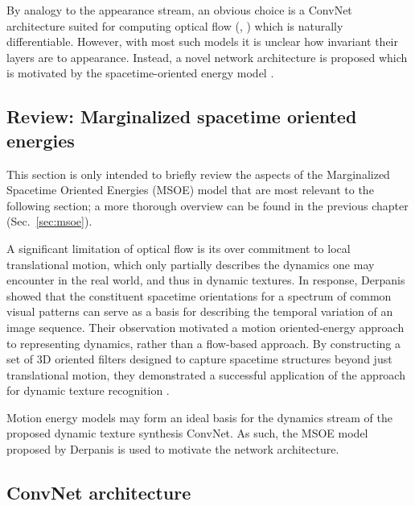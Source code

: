 By analogy to the appearance stream, an obvious choice
is a ConvNet architecture suited for computing
optical flow (\eg, \cite{dosovitskiy2015,ilg2017}) which
is naturally differentiable.
However, with most such models it is unclear how invariant
their layers are to appearance.
Instead, a novel network architecture is proposed which is
motivated by the spacetime-oriented energy model
\cite{derpanis2012spacetime,simoncelli1998}.

\subsection{Review: Marginalized spacetime oriented energies}

 This section is only intended to briefly review the aspects of the Marginalized Spacetime Oriented Energies (MSOE) model \cite{derpanis2012spacetime} that are most relevant to the following section; a more thorough overview can be found in the previous chapter (Sec.\ \ref{sec:msoe}).

A significant limitation of optical flow is its over commitment to local translational motion, which only partially describes the dynamics one may encounter in the real world, and thus in dynamic textures. In response, Derpanis \etal \cite{derpanis2012spacetime} showed that the constituent
spacetime orientations for a spectrum of common
visual patterns can serve as a basis for describing the temporal
variation of an image sequence. Their observation motivated a motion oriented-energy approach to representing dynamics, rather than a flow-based approach. By constructing a set of 3D oriented filters designed to capture spacetime structures beyond just translational motion, they demonstrated a successful application of the approach for dynamic texture recognition \cite{derpanis2012spacetime}.

Motion energy models may form an ideal basis for the dynamics stream of the proposed dynamic texture synthesis ConvNet. As such, the MSOE model proposed by Derpanis \etal \cite{derpanis2012spacetime} is used to motivate the network architecture.

\subsection{ConvNet architecture}

